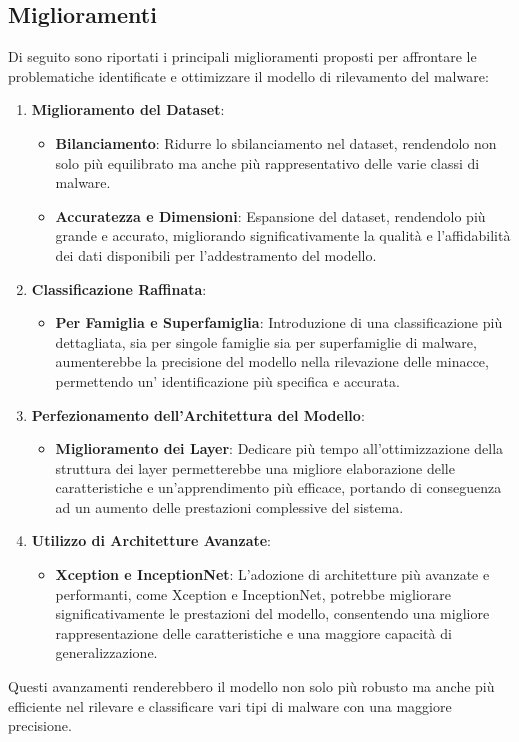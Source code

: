 \subsection{Miglioramenti}
Di seguito sono riportati i principali miglioramenti proposti per affrontare le problematiche identificate e ottimizzare il modello di rilevamento del malware:
\begin{enumerate}
    \item \textbf{Miglioramento del Dataset}:
      \begin{itemize}
        \item \textbf{Bilanciamento}: Ridurre lo sbilanciamento nel dataset, rendendolo non solo più equilibrato ma anche più rappresentativo delle varie classi di malware.
        \item \textbf{Accuratezza e Dimensioni}: Espansione del dataset, rendendolo più grande e accurato, migliorando significativamente la qualità e l'affidabilità dei dati disponibili per l'addestramento del modello.
      \end{itemize}
  
    \item \textbf{Classificazione Raffinata}:
      \begin{itemize}
        \item \textbf{Per Famiglia e Superfamiglia}: Introduzione di una classificazione più dettagliata, sia per singole famiglie sia per superfamiglie di malware, aumenterebbe la precisione del modello nella rilevazione delle minacce, permettendo un' identificazione più specifica e accurata.
      \end{itemize}
  
    \item \textbf{Perfezionamento dell'Architettura del Modello}:
      \begin{itemize}
        \item \textbf{Miglioramento dei Layer}: Dedicare più tempo all'ottimizzazione della struttura dei layer permetterebbe una migliore elaborazione delle caratteristiche e un'apprendimento più efficace, portando di conseguenza ad un aumento delle prestazioni complessive del sistema.
      \end{itemize}

    \item \textbf{Utilizzo di Architetture Avanzate}:
      \begin{itemize}
        \item \textbf{Xception e InceptionNet}: L'adozione di architetture più avanzate e performanti, come Xception e InceptionNet, potrebbe migliorare significativamente le prestazioni del modello, consentendo una migliore rappresentazione delle caratteristiche e una maggiore capacità di generalizzazione.
      \end{itemize}
  \end{enumerate}
  
Questi avanzamenti renderebbero il modello non solo più robusto ma anche più efficiente nel rilevare e classificare vari tipi di malware con una maggiore precisione.
  